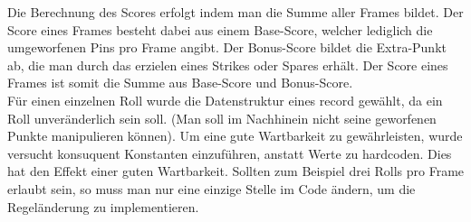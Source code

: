 \documentclass[12pt]{scrartcl}
\begin{document}
Die Berechnung des Scores erfolgt indem man die Summe aller Frames bildet. Der Score eines Frames besteht dabei aus einem Base-Score, welcher lediglich die umgeworfenen Pins pro Frame angibt. Der Bonus-Score bildet die Extra-Punkt ab, die man durch das erzielen eines Strikes oder Spares erhält. Der Score eines Frames ist somit die Summe aus Base-Score und Bonus-Score.\\
Für einen einzelnen Roll wurde die Datenstruktur eines record gewählt, da ein Roll unveränderlich sein soll. (Man soll im Nachhinein nicht seine geworfenen Punkte manipulieren können). Um eine gute Wartbarkeit zu gewährleisten, wurde versucht konsuquent Konstanten einzuführen, anstatt Werte zu hardcoden. Dies hat den Effekt einer guten Wartbarkeit. Sollten zum Beispiel drei Rolls pro Frame erlaubt sein, so muss man nur eine  einzige Stelle im Code ändern, um die Regeländerung zu implementieren.
\end{document}

